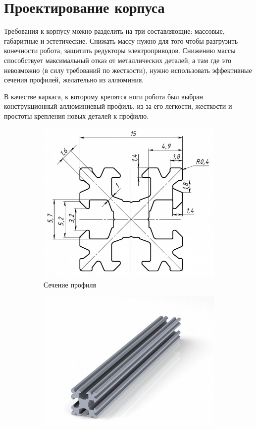 \section{Проектирование корпуса}
Требования к корпусу можно разделить на три составляющие: массовые, габаритные и эстетические. Снижать массу нужно для того чтобы разгрузить конечности робота, защитить редукторы электроприводов. Снижению массы способствует максимальный отказ от металлических деталей, а там где это невозможно (в силу требований по жесткости), нужно использовать эффективные сечения профилей, желательно из аллюминия.

В качестве каркаса, к которому крепятся ноги робота был выбран конструкционный аллюминиевый профиль, из-за его легкости, жесткости и простоты крепления новых деталей к профилю.
\begin{figure}[ht]
    \centering
    \begin{subfigure}[b]{0.45\textwidth}    
        \centering
        \includegraphics[scale=0.65]{chapter_mechanics_construction/figure8.png}
        \caption{Сечение профиля}
    \end{subfigure}
    \begin{subfigure}[b]{0.45\textwidth}
        \centering
        \includegraphics[scale=0.8]{chapter_mechanics_construction/figure9.png}

\end{subfigure}
\end{figure}
